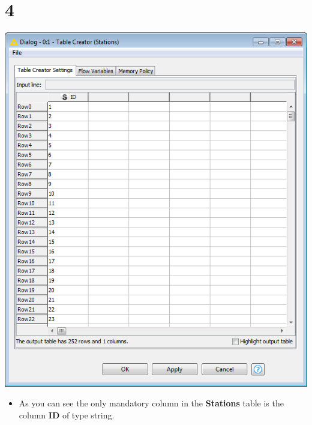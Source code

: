 \documentclass{beamer}
\begin{document}
\section{4}
\begin{frame}
	\begin{center}
  		\includegraphics[height=0.6\textheight]{4.png}
	\end{center}
	\begin{itemize}
		\item As you can see the only mandatory column in the \textbf{Stations} table is the column \textbf{ID} of type string.
	\end{itemize}
\end{frame}
\end{document}
